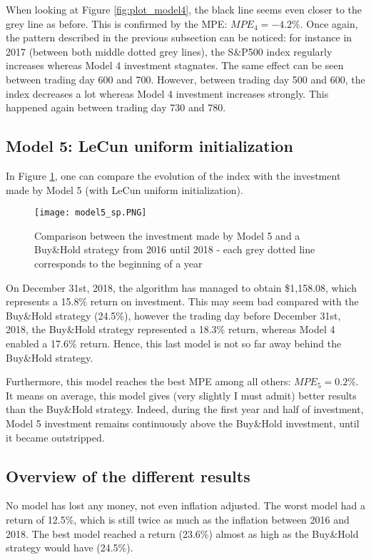 \documentclass[11pt]{article}
\begin{document}
\begin{onehalfspace}
When looking at Figure \ref{fig:plot_model4}, the black line seems even closer to the grey line as before. This is confirmed by the MPE: $MPE_4 = -4.2\%$. Once again, the pattern described in the previous subsection can be noticed: for instance in 2017 (between both middle dotted grey lines), the S\&P500 index regularly increases whereas Model 4 investment stagnates. The same effect can be seen between trading day 600 and 700. However, between trading day 500 and 600, the index decreases a lot whereas Model 4 investment increases strongly. This happened again between trading day 730 and 780. 

\subsection{Model 5: LeCun uniform initialization}

In Figure \ref{fig:plot_model5}, one can compare the evolution of the index with the investment made by Model 5 (with LeCun uniform initialization).

\begin{figure}[h!]
    \centering
    \texttt{[image: model5\_sp.PNG]}
    \caption{Comparison between the investment made by Model 5 and a Buy\&Hold strategy from 2016 until 2018 - each grey dotted line corresponds to the beginning of a year}
\label{fig:plot_model5}
\end{figure}

On December 31st, 2018, the algorithm has managed to obtain \$1,158.08, which represents a 15.8\% return on investment. This may seem bad compared with the Buy\&Hold strategy (24.5\%), however the trading day before December 31st, 2018, the Buy\&Hold strategy represented a 18.3\% return, whereas Model 4 enabled a 17.6\% return. Hence, this last model is not so far away behind the Buy\&Hold strategy. 

Furthermore, this model reaches the best MPE among all others: $MPE_5 = 0.2\%$. It means on average, this model gives (very slightly I must admit) better results than the Buy\&Hold strategy. Indeed, during the first year and half of investment, Model 5 investment remains continuously above the Buy\&Hold investment, until it became outstripped. 

\subsection{Overview of the different results}

No model has lost any money, not even inflation adjusted. The worst model had a return of 12.5\%, which is still twice as much as the inflation between 2016 and 2018. The best model reached a return (23.6\%) almost as high as the Buy\&Hold strategy would have (24.5\%).


\end{onehalfspace}
\end{document}
